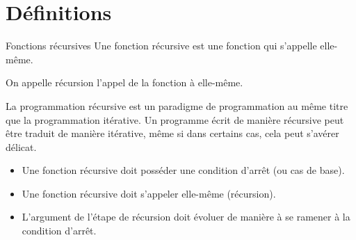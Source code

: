 \def\xxactivite{Cours}

\def\xxauteur{Xavier Pessoles}
\fichefalse \proftrue \tdfalse \courstrue

\def\xxnumchapitre{Chapitre 4 \vspace{.2cm}}
\def\xxchapitre{\hspace{.12cm} Récursivité}

\def\xxcompetences{%
\textsl{%
\textbf{Savoirs et compétences :}\\
\begin{itemize}[label=\ding{112},font=\color{bleuxp}] 
\item Programmation récursive.
\end{itemize}
}}

\def\xxfigures{
\texttt{[image: fractale]}
}%


\setlength{\columnseprule}{.1pt}

\vspace{2cm}
\pagestyle{fancy}
\thispagestyle{plain}


\section{Définitions}
\begin{defi}{Fonctions récursives}
Une fonction récursive est une fonction qui s'appelle elle-même.

On appelle récursion l'appel de la fonction à elle-même.
\end{defi}

La programmation récursive est un paradigme de programmation au même titre que la programmation itérative. Un programme écrit de manière récursive peut être traduit de manière itérative, même si dans certains cas, cela peut s'avérer délicat.


\begin{methode}
\begin{itemize}
\item Une fonction récursive doit posséder une condition d'arrêt (ou cas de base).
\item Une fonction récursive doit s'appeler elle-même (récursion).
\item L'argument de l'étape de récursion doit évoluer de manière à se ramener à la condition d'arrêt.
\end{itemize}
\end{methode}
 
